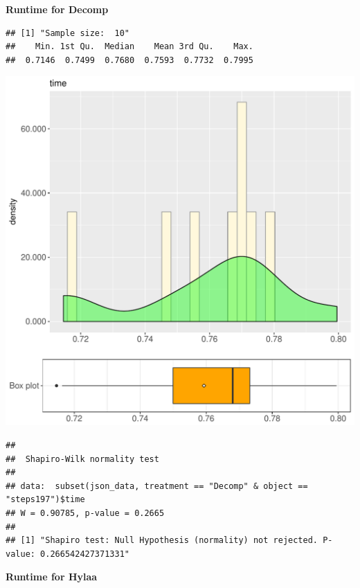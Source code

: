 \documentclass{article}\usepackage[]{graphicx}\usepackage[]{color}
\makeatletter
\def\maxwidth{ %
  \ifdim\Gin@nat@width>\linewidth
    \linewidth
  \else
    \Gin@nat@width
  \fi
}
\newenvironment{kframe}{%
 \def\at@end@of@kframe{}%
 \ifinner\ifhmode%
  \def\at@end@of@kframe{\end{minipage}}%
  \begin{minipage}{\columnwidth}%
 \fi\fi%
 \def\FrameCommand##1{\hskip\@totalleftmargin \hskip-\fboxsep
 \colorbox{shadecolor}{##1}\hskip-\fboxsep
     \hskip-\linewidth \hskip-\@totalleftmargin \hskip\columnwidth}%
 \MakeFramed {\advance\hsize-\width
   \@totalleftmargin\z@ \linewidth\hsize
   \@setminipage}}%
 {\par\unskip\endMakeFramed%
 \at@end@of@kframe}
\newenvironment{knitrout}{}{} %
\makeatother
\begin{document}
 \textbf{Runtime for Decomp}
\begin{knitrout}
\color{fgcolor}\begin{kframe}
\begin{verbatim}
## [1] "Sample size:  10"
##    Min. 1st Qu.  Median    Mean 3rd Qu.    Max. 
##  0.7146  0.7499  0.7680  0.7593  0.7732  0.7995
\end{verbatim}
\end{kframe}
\includegraphics[width=\maxwidth]{figure/RH2_Decomp_steps197-1} 
\begin{kframe}\begin{verbatim}
## 
## 	Shapiro-Wilk normality test
## 
## data:  subset(json_data, treatment == "Decomp" & object == "steps197")$time
## W = 0.90785, p-value = 0.2665
## 
## [1] "Shapiro test: Null Hypothesis (normality) not rejected. P-value: 0.266542427371331"
\end{verbatim}
\end{kframe}
\end{knitrout}
 \textbf{Runtime for Hylaa}
\end{document}
